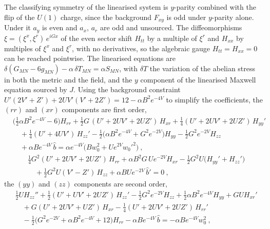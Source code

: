 The classifying symmetry of the
linearised system is $y$-parity combined with the flip of the $U(1)$ charge,
since the background $F_{xy}$ is odd under $y$-parity alone. Under it $a_y$
is even and $a_x$, $a_r$ are odd and unsourced. The diffeomorphisms
$\xi = (\xi^x, \xi^r)\,e^{iGx}$ of the even sector shift $H_{tt}$ by a
multiple of $\xi^r$ and $H_{xx}$ by multiples of $\xi^x$ and $\xi^r$, with
no derivatives, so the algebraic gauge $H_{tt} = H_{xx} = 0$ can be reached
pointwise. The linearised equations are
$\delta(G_{MN} - 6g_{MN}) - \alpha\,\delta T_{MN} = \alpha S_{MN}$, with
$\delta T$ the variation of the abelian stress in both the metric and the
field, and the $y$ component of the linearised Maxwell equation sourced by
$J$. Using the background constraint
$U'(2V' + Z') + 2UV'(V' + 2Z') = 12 - \alpha B^2e^{-4V}$ to simplify the
coefficients, the $(rr)$ and $(xr)$ components are first order,
\begin{equation}
\begin{split}
&\big(\tfrac12\alpha B^2e^{-4V} - 6\big)H_{rr} + \tfrac12 G\,(U' + 2UV' + 2UZ')\,H_{xr}
+ \tfrac14(U' + 2UV' + 2UZ')\,H_{yy}' \\
&\quad + \tfrac14(U' + 4UV')\,H_{zz}' - \tfrac12\big(\alpha B^2e^{-4V} + G^2e^{-2V}\big)H_{yy} - \tfrac12 G^2e^{-2V}H_{zz} \\
&\quad + \alpha Be^{-4V}\,\hat b = \alpha e^{-4V}\big(Bw_0^2 + Ue^{2V}w_0'^2\big)~,
\end{split}
\end{equation}
\begin{equation}
\begin{split}
&\tfrac14 G^2(U' + 2UV' + 2UZ')\,H_{rr} + \alpha B^2 G\,Ue^{-2V}H_{xr}
- \tfrac12 G^2U\big(H_{yy}' + H_{zz}'\big) \\
&\quad + \tfrac12 G^2U(V' - Z')\,H_{zz} + \alpha BUe^{-2V}\,\hat b' = 0~,
\end{split}
\end{equation}
the $(yy)$ and $(zz)$ components are second order,
\begin{equation}
\begin{split}
&\tfrac12 U H_{zz}'' + \tfrac12(U' + UV' + 2UZ')\,H_{zz}' - \tfrac12 G^2e^{-2V}H_{zz}
+ \tfrac12\alpha B^2e^{-4V}H_{yy} + GUH_{xr}' \\
&\quad + G(U' + 2UV' + UZ')\,H_{xr} - \tfrac14(U' + 2UV' + 2UZ')\,H_{rr}' \\
&\quad - \tfrac12\big(G^2e^{-2V} + \alpha B^2e^{-4V} + 12\big)H_{rr}
- \alpha Be^{-4V}\,\hat b = -\alpha Be^{-4V}w_0^2~,
\end{split}
\end{equation}
